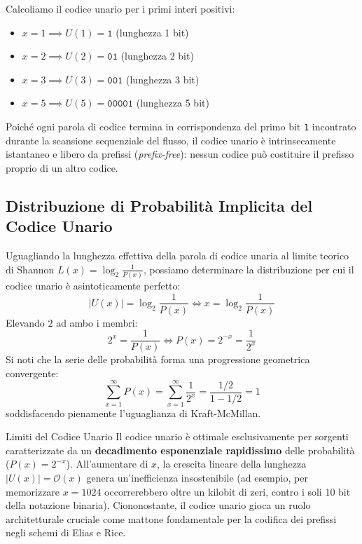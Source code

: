 \begin{example}
Calcoliamo il codice unario per i primi interi positivi:
\begin{itemize}
  \item $x = 1 \implies U(1) = \texttt{1}$ (lunghezza 1 bit)
  \item $x = 2 \implies U(2) = \texttt{01}$ (lunghezza 2 bit)
  \item $x = 3 \implies U(3) = \texttt{001}$ (lunghezza 3 bit)
  \item $x = 5 \implies U(5) = \texttt{00001}$ (lunghezza 5 bit)
\end{itemize}
\end{example}

Poich\'e ogni parola di codice termina in corrispondenza del primo bit \texttt{1} incontrato durante la scansione sequenziale del flusso, il codice unario \`e intrinsecamente istantaneo e libero da prefissi (\textit{prefix-free}): nessun codice pu\`o costituire il prefisso proprio di un altro codice.

\FloatBarrier
\subsection{Distribuzione di Probabilit\`a Implicita del Codice Unario}
\label{subsec:distribuzione-implicita-unario}

Uguagliando la lunghezza effettiva della parola di codice unaria al limite teorico di Shannon $L(x) = \log_2 \frac{1}{P(x)}$, possiamo determinare la distribuzione per cui il codice unario \`e asintoticamente perfetto:
\begin{equation}
  |U(x)| = \log_2 \frac{1}{P(x)} \iff x = \log_2 \frac{1}{P(x)}
\end{equation}
Elevando $2$ ad ambo i membri:
\begin{equation}
  2^x = \frac{1}{P(x)} \iff P(x) = 2^{-x} = \frac{1}{2^x}
\end{equation}
Si noti che la serie delle probabilit\`a forma una progressione geometrica convergente:
\begin{equation}
  \sum_{x=1}^{\infty} P(x) = \sum_{x=1}^{\infty} \frac{1}{2^x} = \frac{1/2}{1 - 1/2} = 1
\end{equation}
soddisfacendo pienamente l'uguaglianza di Kraft-McMillan.

\begin{noteblock}{Limiti del Codice Unario}
Il codice unario \`e ottimale esclusivamente per sorgenti caratterizzate da un \textbf{decadimento esponenziale rapidissimo} delle probabilit\`a ($P(x) = 2^{-x}$). All'aumentare di $x$, la crescita lineare della lunghezza $|U(x)| = \mathcal{O}(x)$ genera un'inefficienza insostenibile (ad esempio, per memorizzare $x = 1024$ occorrerebbero oltre un kilobit di zeri, contro i soli 10 bit della notazione binaria). Ciononostante, il codice unario gioca un ruolo architetturale cruciale come mattone fondamentale per la codifica dei prefissi negli schemi di Elias e Rice.
\end{noteblock}

